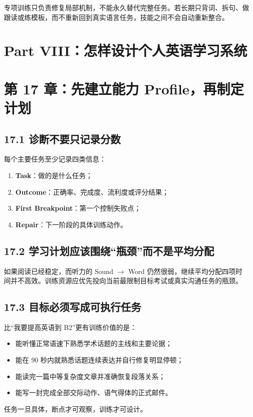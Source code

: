 \documentclass[11pt,a4paper]{ctexart}
\newcommand{\kw}[1]{\textbf{#1}}
\begin{document}
\begin{warn}[专项训练的边界]
专项训练只负责修复局部机制，不能永久替代完整任务。若长期只背词、拆句、做跟读或练模板，而不重新回到真实语言任务，技能之间不会自动重新整合。
\end{warn}

\newpage
\section{Part VIII：怎样设计个人英语学习系统}

\section{第 17 章：先建立能力 Profile，再制定计划}

\subsection{17.1 诊断不要只记录分数}
每个主要任务至少记录四类信息：
\begin{enumerate}
  \item \kw{Task}：做的是什么任务；
  \item \kw{Outcome}：正确率、完成度、流利度或评分结果；
  \item \kw{First Breakpoint}：第一个控制失败点；
  \item \kw{Repair}：下一阶段的具体训练动作。
\end{enumerate}

\subsection{17.2 学习计划应该围绕“瓶颈”而不是平均分配}
如果阅读已经稳定，而听力的 Sound $\rightarrow$ Word 仍然很弱，继续平均分配四项时间并不高效。训练资源应优先投向当前最限制目标考试或真实沟通任务的瓶颈。

\subsection{17.3 目标必须写成可执行任务}
比“我要提高英语到 B2”更有训练价值的是：
\begin{itemize}
  \item 能听懂正常语速下熟悉学术话题的主线和主要论据；
  \item 能在 90 秒内就熟悉话题连续表达并自行修复明显停顿；
  \item 能读完一篇中等复杂度文章并准确恢复段落关系；
  \item 能写一封完成全部交际动作、语气得体的正式邮件。
\end{itemize}
任务一旦具体，断点才可观察，训练才可设计。
\end{document}
